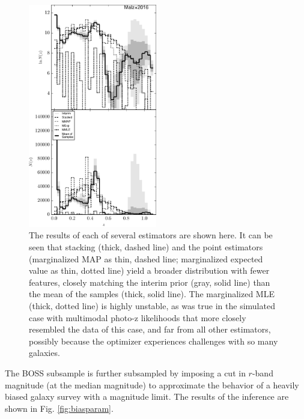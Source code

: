 \documentclass[preprint]{aastex}
\begin{document}
\begin{figure}
\includegraphics[width=0.5\textwidth]{figs/boss/comps.pdf}
\caption{The results of each of several estimators are shown here.  It can be 
seen that stacking (thick, dashed line) and the point estimators (marginalized 
MAP as thin, dashed line; marginalized expected value as thin, dotted line) 
yield a broader distribution with fewer features, closely matching the interim 
prior (gray, solid line) than the mean of the samples (thick, solid line).  The 
marginalized MLE (thick, dotted line) is highly unstable, as was true in the 
simulated case with multimodal photo-z likelihoods that more closely resembled 
the data of this case, and far from all other estimators, possibly because the 
optimizer experiences challenges with so many galaxies.}
\label{fig:datacomp}
\end{figure}

The BOSS subsample is further subsampled by imposing a cut in $r$-band 
magnitude (at the median magnitude) to approximate the behavior of a heavily 
biased galaxy survey with a magnitude limit.  The results of the inference are 
shown in Fig. \ref{fig:biasparam}.
\end{document}
